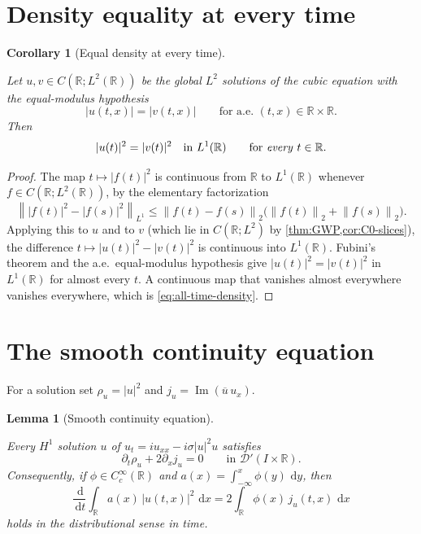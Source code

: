 \documentclass[11pt,oneside]{book}
\providecommand{\uses}[1]{}
\newtheorem{lemma}[theorem]{Lemma}
\newtheorem{corollary}[theorem]{Corollary}
\theoremstyle{definition}
\theoremstyle{remark}
\newcommand{\R}{\mathbb R}
\newcommand{\1}{\mathbf 1}
\newcommand{\Ima}{\operatorname{Im}}
\newcommand{\dd}{\,\mathrm d}
\newcommand{\norm}[1]{\left\lVert #1\right\rVert}
\begin{document}
\section{Density equality at every time}

\begin{corollary}[Equal density at every time]\label{cor:all-time-density}
\uses{thm:GWP, cor:C0-slices}
Let $u,v\in C(\R;L^2(\R))$ be the global $L^2$ solutions of the cubic
equation with the equal-modulus hypothesis
\[
 |u(t,x)|=|v(t,x)|\qquad\text{for a.e. }(t,x)\in\R\times\R .
\]
Then
\begin{equation}
 |u(t)|^2=|v(t)|^2\quad\text{in }L^1(\R)
 \qquad\text{for \emph{every} }t\in\R. \label{eq:all-time-density}
\end{equation}
\end{corollary}

\begin{proof}
\uses{thm:GWP, cor:C0-slices}
The map $t\mapsto|f(t)|^2$ is continuous from $\R$ to $L^1(\R)$ whenever
$f\in C(\R;L^2(\R))$, by the elementary factorization
\[
 \norm{|f(t)|^2-|f(s)|^2}_{L^1}
 \le\norm{f(t)-f(s)}_2\bigl(\norm{f(t)}_2+\norm{f(s)}_2\bigr).
\]
Applying this to $u$ and to $v$ (which lie in $C(\R;L^2)$ by
\cref{thm:GWP,cor:C0-slices}), the difference $t\mapsto|u(t)|^2-|v(t)|^2$ is
continuous into $L^1(\R)$. Fubini's theorem and the a.e.\ equal-modulus
hypothesis give $|u(t)|^2=|v(t)|^2$ in $L^1(\R)$ for almost every $t$. A
continuous map that vanishes almost everywhere vanishes everywhere, which is
\eqref{eq:all-time-density}.
\end{proof}

\section{The smooth continuity equation}

For a solution set $\rho_u=|u|^2$ and $j_u=\Ima(\overline u\,u_x)$.

\begin{lemma}[Smooth continuity equation]\label{lem:smooth-continuity-equation}
\uses{def:propagator}
Every $H^1$ solution $u$ of $u_t=i u_{xx}-i\sigma|u|^2u$ satisfies
\begin{equation}
 \partial_t\rho_u+2\partial_xj_u=0
 \qquad\text{in }\mathcal{D}'(I\times\R). \label{eq:continuity-eq}
\end{equation}
Consequently, if $\phi\in C_c^\infty(\R)$ and
$a(x)=\int_{-\infty}^x\phi(y)\,\dd y$, then
\begin{equation}
 \frac{\dd}{\dd t}\int_\R a(x)\,|u(t,x)|^2\,\dd x
 =2\int_\R\phi(x)\,j_u(t,x)\,\dd x \label{eq:localized-mass-smooth}
\end{equation}
holds in the distributional sense in time.
\end{lemma}
\end{document}
